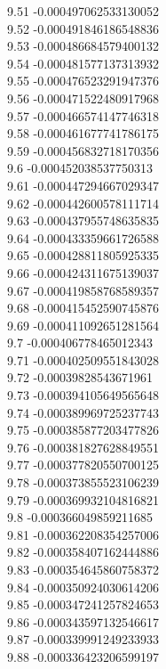 {9.51	-0.000497062533130052\\
9.52	-0.000491846186548836\\
9.53	-0.000486684579400132\\
9.54	-0.000481577137313932\\
9.55	-0.000476523291947376\\
9.56	-0.000471522480917968\\
9.57	-0.000466574147746318\\
9.58	-0.000461677741786175\\
9.59	-0.000456832718170356\\
9.6	-0.000452038537750313\\
9.61	-0.000447294667029347\\
9.62	-0.000442600578111714\\
9.63	-0.000437955748635835\\
9.64	-0.000433359661726588\\
9.65	-0.000428811805925335\\
9.66	-0.000424311675139037\\
9.67	-0.000419858768589357\\
9.68	-0.000415452590745876\\
9.69	-0.000411092651281564\\
9.7	-0.000406778465012343\\
9.71	-0.000402509551843028\\
9.72	-0.00039828543671961\\
9.73	-0.000394105649565648\\
9.74	-0.000389969725237743\\
9.75	-0.000385877203477826\\
9.76	-0.000381827628849551\\
9.77	-0.000377820550700125\\
9.78	-0.000373855523106239\\
9.79	-0.000369932104816821\\
9.8	-0.000366049859211685\\
9.81	-0.000362208354257006\\
9.82	-0.000358407162444886\\
9.83	-0.000354645860758372\\
9.84	-0.000350924030614206\\
9.85	-0.000347241257824653\\
9.86	-0.000343597132546617\\
9.87	-0.000339991249233933\\
9.88	-0.000336423206599197\\
}
